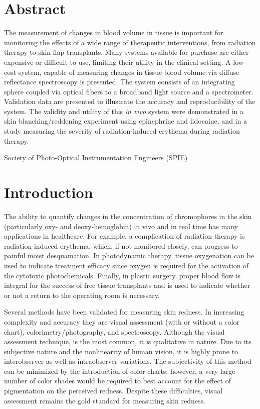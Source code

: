\section*{Abstract}
The measurement of changes in blood volume in tissue is important for monitoring the effects of a wide range of therapeutic interventions, from radiation therapy to skin-flap transplants. Many systems available for purchase are either expensive or difficult to use, limiting their utility in the clinical setting. A low-cost system, capable of measuring changes in tissue blood volume via diffuse reflectance spectroscopy is presented. The system consists of an integrating sphere coupled via optical fibers to a broadband light source and a spectrometer. Validation data are presented to illustrate the accuracy and reproducibility of the system. The validity and utility of this \emph{in vivo} system were demonstrated in a skin blanching/reddening experiment using epinephrine and lidocaine, and in a study measuring the severity of radiation-induced erythema during radiation therapy.

\noindent {} Society of Photo-Optical Instrumentation Engineers (SPIE)

\section{Introduction}
The ability to quantify changes in the concentration of chromophores in the skin (particularly oxy- and deoxy-hemoglobin) in vivo and in real time has many applications in healthcare. For example, a complication of radiation therapy is radiation-induced erythema, which, if not monitored closely, can progress to painful moist desquamation.\cite{Hopewell1990,Russell1994,Nystrom2004,Fitzgerald2008} In photodynamic therapy, tissue oxygenation can be used to indicate treatment efficacy\cite{Woodhams2007} since oxygen is required for the activation of the cytotoxic photochemicals.\cite{Patterson1989a,Wilson2008} Finally, in plastic surgery, proper blood flow is integral for the success of free tissue transplants and is used to indicate whether or not a return to the operating room is necessary.\cite{Steele2011}

Several methods have been validated for measuring skin redness. In increasing complexity and accuracy they are visual assessment (with or without a color chart), colorimetry/photography, and spectroscopy.\cite{Agache2004} Although the visual assessment technique,\cite{Trotti2003} is the most common, it is qualitative in nature. Due to its subjective nature and the nonlinearity of human vision, it is highly prone to interobserver as well as intraobserver variations.\cite{Bodekaer2013} The subjectivity of this method can be minimized by the introduction of color charts; however, a very large number of color shades would be required to best account for the effect of pigmentation on the perceived redness. Despite these difficulties, visual assessment remains the gold standard for measuring skin redness.\cite{Basketter1997,Wengstrom2004}

